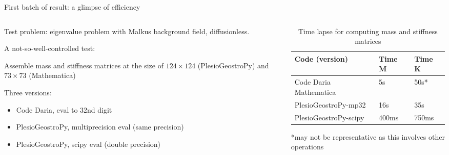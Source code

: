 \documentclass[11pt,aspectratio=169]{beamer}
\begin{document}
\begin{frame}{First batch of result: a glimpse of efficiency}
	\begin{columns}
	\begin{column}{.4\linewidth}
		Test problem: eigenvalue problem with Malkus background field, diffusionless.
		\vspace{1em}
		
		A not-so-well-controlled test:

		Assemble mass and stiffness matrices at the size of $124\times 124$ (PlesioGeostroPy) and $73\times 73$ (Mathematica)
		\vspace{1em}

		Three versions:
		\begin{itemize}
			\item Code Daria, eval to 32nd digit
			\item PlesioGeostroPy, multiprecision eval (same precision)
			\item PlesioGeostroPy, scipy eval (double precision)
		\end{itemize}
	\end{column}
	\begin{column}{.55\linewidth}
		\begin{table}
			\caption{Time lapse for computing mass and stiffness matrices}
			\begin{tabular}{lll}
				\toprule
				Code (version) & Time $\mathbf{M}$ & Time $\mathbf{K}$ \\ 
				\midrule
				Code Daria Mathematica & 5s & 50s* \\ 
				PlesioGeostroPy-mp32 & 16s & 35s \\ 
				PlesioGeostroPy-scipy & 400ms & 750ms \\
				\bottomrule
			\end{tabular}
		\end{table}
		*{\scriptsize may not be representative as this involves other operations}

	\end{column}
	\end{columns}
\end{frame}
\end{document}
